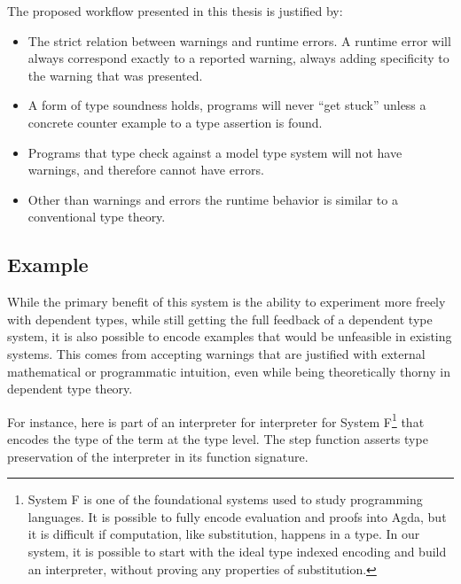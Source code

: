 The proposed workflow presented in this thesis is justified by:
\begin{itemize}
\item The strict relation between warnings and runtime errors.
A runtime error will always correspond exactly to a reported warning, always adding specificity to the warning that was presented.
\item A form of type soundness holds, programs will never ``get stuck'' unless a concrete counter example to a type assertion is found.
\item Programs that type check against a model type system will not have warnings, and therefore cannot have errors.
\item Other than warnings and errors the runtime behavior is similar to a conventional type theory.
\end{itemize}

\subsection{Example}

While the primary benefit of this system is the ability to experiment more freely with dependent types, while still getting the full feedback of a dependent type system, it is also possible to encode examples that would be unfeasible in existing systems.
This comes from accepting warnings that are justified with external mathematical or programmatic intuition, even while being theoretically thorny in dependent type theory.

For instance, here is part of an interpreter for interpreter for System F\footnote{
 System F is one of the foundational systems used to study programming languages.
 It is possible to fully encode evaluation and proofs into Agda, but it is difficult if computation, like substitution, happens in a type.
 In our system, it is possible to start with the ideal type indexed encoding and build an interpreter, without proving any properties of substitution.
} that encodes the type of the term at the type level.
The step function asserts type preservation of the interpreter in its function signature.

